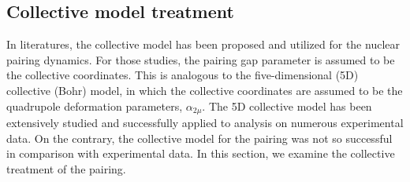 \documentclass[%
superscriptaddress,
preprint,
showpacs,
nofootinbib,
amsmath,amssymb,
prc,
floatfix ]%
{revtex4-1}
\begin{document}




\subsection{Collective model treatment}

In literatures, the collective model has been proposed
and utilized for the nuclear pairing dynamics.
For those studies, the pairing gap parameter is assumed to be the
collective coordinates.
This is analogous to the five-dimensional (5D) collective (Bohr) model,
in which the collective coordinates are assumed to be the
quadrupole deformation parameters, $\alpha_{2\mu}$.
The 5D collective model has been extensively studied and
successfully applied to analysis on numerous experimental data.
On the contrary, the collective model for the pairing was not so
successful in comparison with experimental data.
In this section, we examine the collective treatment of the pairing.

\end{document}
